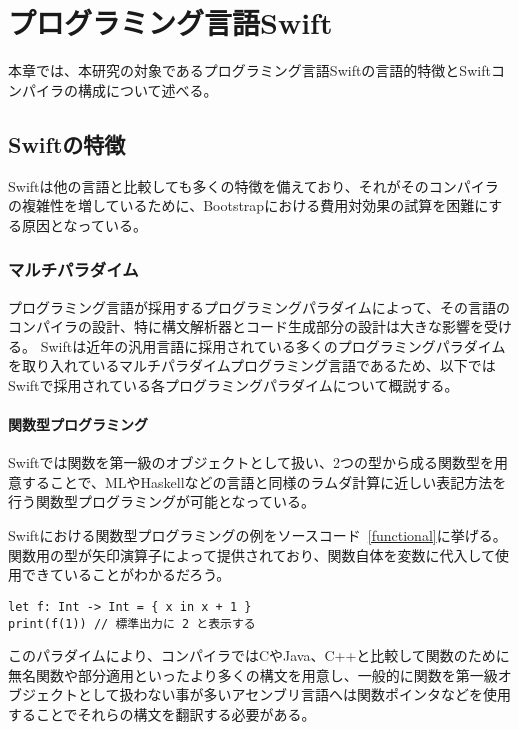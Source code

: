 \chapter{プログラミング言語Swift}
\label{explain-swift}

本章では、本研究の対象であるプログラミング言語Swiftの言語的特徴とSwiftコンパイラの構成について述べる。

\section{Swiftの特徴}

Swiftは他の言語と比較しても多くの特徴を備えており、それがそのコンパイラの複雑性を増しているために、Bootstrapにおける費用対効果の試算を困難にする原因となっている。

\subsection{マルチパラダイム}

プログラミング言語が採用するプログラミングパラダイムによって、その言語のコンパイラの設計、特に構文解析器とコード生成部分の設計は大きな影響を受ける。
Swiftは近年の汎用言語に採用されている多くのプログラミングパラダイムを取り入れているマルチパラダイムプログラミング言語であるため、以下ではSwiftで採用されている各プログラミングパラダイムについて概説する。

\subsubsection{関数型プログラミング}

Swiftでは関数を第一級のオブジェクトとして扱い、2つの型から成る関数型を用意することで、MLやHaskellなどの言語と同様のラムダ計算に近しい表記方法を行う関数型プログラミングが可能となっている。

Swiftにおける関数型プログラミングの例をソースコード~\ref{functional}に挙げる。
関数用の型が矢印演算子によって提供されており、関数自体を変数に代入して使用できていることがわかるだろう。

\begin{lstlisting}[caption=Swiftにおける関数型プログラミングの例, label=functional]
let f: Int -> Int = { x in x + 1 }
print(f(1)) // 標準出力に 2 と表示する
\end{lstlisting}

このパラダイムにより、コンパイラではCやJava、C++と比較して関数のために無名関数や部分適用といったより多くの構文を用意し、一般的に関数を第一級オブジェクトとして扱わない事が多いアセンブリ言語へは関数ポインタなどを使用することでそれらの構文を翻訳する必要がある。

